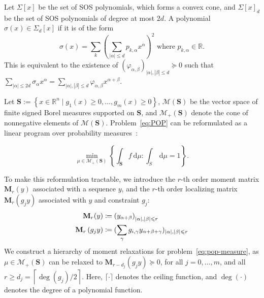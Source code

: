\documentclass[10pt]{article} %
\theoremstyle{plain}
\theoremstyle{definition}
\theoremstyle{remark}
\begin{document}
Let $\Sigma[x]$ be the set of SOS polynomials, which forms a convex cone, and $\Sigma[x]_d$ be the set of SOS polynomials of degree at most $2 d$. A polynomial $\sigma(x) \in \Sigma_d[x]$ if it is of the form
\vspace{-1em}
\begin{equation}
\label{eq:SOS-d-def}
\sigma(x)=\sum_k\left(\sum_{|\alpha| \leqslant d} p_{k, \alpha} x^\alpha\right)^2 \text { where } p_{k, \alpha} \in \mathbb{R}.
\end{equation}
This is equivalent to the existence of $\left(\varphi_{\alpha, \beta}\right)_{|\alpha|,|\beta| \leqslant d} \succcurlyeq 0$ such that $\sum_{|\alpha| \leqslant 2 d} \sigma_\alpha x^\alpha=\sum_{|\alpha|,|\beta| \leqslant d} \varphi_{\alpha, \beta} x^{\alpha+\beta}$.

Let $\mathbf{S}:=\left\{x \in \mathbb{R}^n \mid g_1(x) \geq 0, \ldots, g_m(x) \geq 0\right\}$, $\mathscr{M}(\mathbf{S})$ be the vector space of finite signed Borel measures supported on $\mathbf{S}$, and $\mathscr{M}_{+}(\mathbf{S})$ denote the cone of nonnegative elements of $\mathscr{M}(\mathbf{S})$. Problem~\eqref{eq:POP} can be reformulated as a linear program over probability measures~\citep{lasserre2015introduction}:

\begin{equation}
\min _{\mu \in \mathscr{M}_{+}(\mathbf{S})}\left\{\int_{\mathbf{S}} f \mathrm{~d} \mu: \int_S \mathrm{~d} \mu=1\right\}.
\label{eq:pop-measure}
\end{equation}

To make this reformulation tractable, we introduce the $r$-th order moment matrix $\mathbf{M}_r(y)$ associated with a sequence $y$, and the $r$-th order localizing matrix $\mathbf{M}_{r}\left(g_j y\right)$ associated with $y$ and constraint $g_j$:
\vspace{-0.5em}
\begin{equation}
\begin{aligned}
\mathbf{M}_r(y)&\coloneq\left(y_{\alpha+\beta}\right)_{|\alpha|,|\beta| \leqslant r}\\
\mathbf{M}_{r}\left(g_j y\right)&\coloneq(\sum_\gamma g_{i, \gamma} y_{\alpha+\beta+\gamma})_{|\alpha|,|\beta| \leqslant r}
\end{aligned}
\label{eq:Mr-def}
\vspace{-0.5em}
\end{equation}
We construct a hierarchy of moment relaxations for problem~\eqref{eq:pop-measure}, as $\mu \in \mathscr{M}_{+}(\mathbf{S})$ can be relaxed to $\mathbf{M}_{r-d_j}\left(g_j y\right) \succeq 0$, for all $j=0, \ldots, m$, and all $r \geq d_j=\left\lceil\operatorname{deg}\left(g_j\right) / 2\right\rceil$. Here, $\lceil\cdot\rceil$ denotes the ceiling function, and $\operatorname{deg}(\cdot)$ denotes the degree of a polynomial function.
\end{document}
